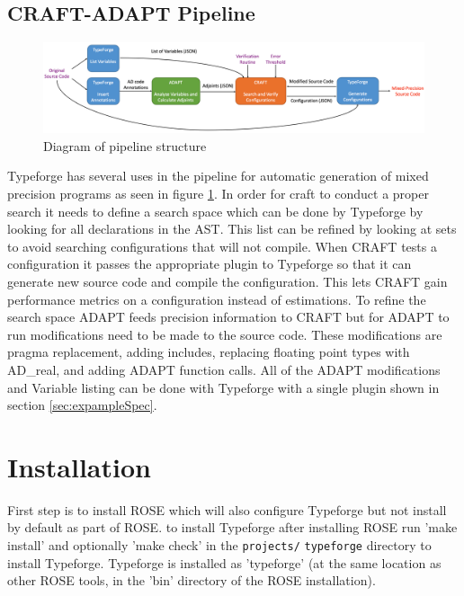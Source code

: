 \documentclass[natbib]{article}
\begin{document}
\subsection{CRAFT-ADAPT Pipeline}\label{sec:pipeline}
\begin{figure}[h]
    \centering
    \includegraphics[width=\textwidth]{pipeline.png}
    \caption{\textsf{Diagram of pipeline structure}}
    \label{fig:pipeline}
\end{figure}
\noindent
Typeforge has several uses in the pipeline for automatic generation of mixed precision programs
as seen in figure \ref{fig:pipeline}. 
In order for craft to conduct a proper search it needs to define 
a search space which can be done by Typeforge by looking for all declarations in the AST. This 
list can be refined by looking at sets to avoid searching configurations that will not compile. 
When CRAFT tests a configuration it passes the appropriate plugin to Typeforge so 
that it can generate new source code and compile the configuration. This lets CRAFT gain 
performance metrics on a configuration instead of estimations. To refine the search space ADAPT 
feeds precision information to CRAFT but for ADAPT to run modifications need to be made to the 
source code. These modifications are pragma replacement, adding includes, replacing floating point 
types with AD\_real, and adding ADAPT function calls. All of the ADAPT modifications and Variable 
listing can be done with Typeforge with a single plugin shown in section \ref{sec:expampleSpec}.

\section{Installation}

First step is to install ROSE which will also configure Typeforge but not install
by default as part of ROSE. to install Typeforge after installing ROSE run
'make install' and optionally 'make check' in the \verb+projects/+ \verb+typeforge+ directory to 
install Typeforge. Typeforge is installed as 'typeforge' (at the same location as other ROSE tools, 
in the 'bin' directory of the ROSE installation).
\end{document}
